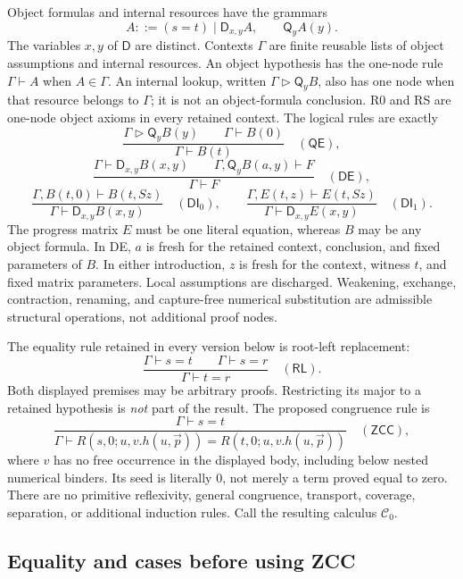 \documentclass[11pt,letterpaper]{article}
\theoremstyle{definition}\newtheorem{definition}[theorem]{Definition}
\theoremstyle{remark}\newtheorem{remark}[theorem]{Remark}
\begin{document}
Object formulas and internal resources have the grammars
\[
 A::=(s=t)\mid\mathsf D_{x,y}A,
 \qquad \mathsf Q_yA(y).
\]
The variables $x,y$ of $\mathsf D$ are distinct. Contexts $\Gamma$ are
finite reusable lists of object assumptions and internal resources.
An object hypothesis has the one-node rule $\Gamma\vdash A$ when
$A\in\Gamma$. An internal lookup, written
$\Gamma\mathrel{\triangleright}\mathsf Q_yB$, also has one node when
that resource belongs to $\Gamma$; it is not an object-formula conclusion.
R0 and RS are one-node object axioms in every retained context.
The logical rules are exactly
\[
 \frac{\Gamma\mathrel{\triangleright}\mathsf Q_yB(y)
       \qquad\Gamma\vdash B(0)}
      {\Gamma\vdash B(t)}\quad(\mathsf{QE}),
\]
\[
 \frac{\Gamma\vdash\mathsf D_{x,y}B(x,y)\qquad
       \Gamma,\mathsf Q_yB(a,y)\vdash F}
      {\Gamma\vdash F}\quad(\mathsf{DE}),
\]
\[
 \frac{\Gamma,B(t,0)\vdash B(t,Sz)}
      {\Gamma\vdash\mathsf D_{x,y}B(x,y)}
      \quad(\mathsf{DI}_{0}),
 \qquad
 \frac{\Gamma,E(t,z)\vdash E(t,Sz)}
      {\Gamma\vdash\mathsf D_{x,y}E(x,y)}
      \quad(\mathsf{DI}_{1}).
\]
The progress matrix $E$ must be one literal equation, whereas $B$ may
be any object formula. In DE, $a$ is fresh for the retained context,
conclusion, and fixed parameters of $B$. In either introduction, $z$
is fresh for the context, witness $t$, and fixed matrix parameters.
Local assumptions are discharged. Weakening, exchange, contraction,
renaming, and capture-free numerical substitution are admissible
structural operations, not additional proof nodes.

The equality rule retained in every version below is root-left replacement:
\[
 \frac{\Gamma\vdash s=t\qquad\Gamma\vdash s=r}
      {\Gamma\vdash t=r}\quad(\mathsf{RL}).
 \label{zcc:root}
\]
Both displayed premises may be arbitrary proofs. Restricting its major
to a retained hypothesis is \emph{not} part of the result.
The proposed congruence rule is
\[
 \frac{\Gamma\vdash s=t}
 {\Gamma\vdash R(s,0;u,v.h(u,\vec p))=
                  R(t,0;u,v.h(u,\vec p))}
 \quad(\mathsf{ZCC}),
 \label{zcc:rule}
\]
where $v$ has no free occurrence in the displayed body, including below
nested numerical binders. Its seed is literally $0$, not merely a term
proved equal to zero. There are no primitive reflexivity, general
congruence, transport, coverage, separation, or additional induction rules.
Call the resulting calculus $\mathcal C_0$.

\subsection{Equality and cases before using ZCC}
\end{document}
